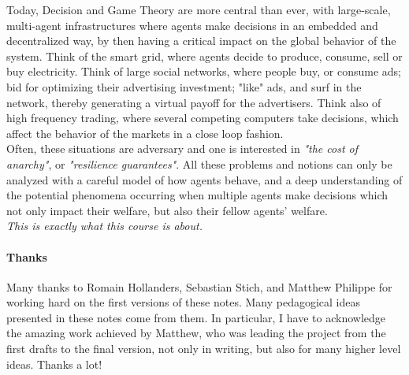Today, Decision and Game Theory are more central than ever, with large-scale, multi-agent infrastructures where agents make decisions in an embedded and decentralized way, by then having a critical impact on the global behavior of the system.  Think of the smart grid, where agents decide to produce, consume, sell or buy electricity.  Think of large social networks, where people buy, or consume ads; bid for optimizing their advertising investment; "like" ads, and surf in the network, thereby generating a virtual payoff for the advertisers.  Think also of high frequency trading, where several competing computers take decisions, which affect the behavior of the markets in a close loop fashion.\\   Often, these situations are adversary and one is interested in \emph{"the cost of anarchy"}, or \emph{"resilience guarantees"}.  All these problems and notions can only be analyzed with a careful model of how agents behave, and a deep understanding of the potential phenomena occurring when multiple agents make decisions which not only impact their welfare, but also their fellow agents' welfare.  \\
\emph{This is exactly what this course is about.}


\paragraph{Thanks}
Many thanks to Romain Hollanders, Sebastian Stich, and Matthew Philippe for working hard on the first versions of these notes. Many pedagogical ideas presented in these notes come from them.  In particular, I have to acknowledge the amazing work achieved by Matthew, who was leading the project from the first drafts to the final version, not only in writing, but also for many higher level ideas.  Thanks a lot!

\label{chap:intro}




\ifx \globalmark \undefined %


	
\else 
	
\fi




